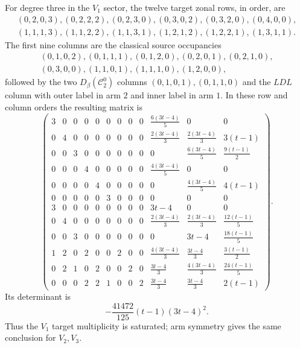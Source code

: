 \documentclass[11pt]{amsart}
\theoremstyle{definition}
\theoremstyle{remark}
\newcommand{\cc}{\mathcal}
\begin{document}
For degree three in the $V_1$ sector, the twelve target zonal rows, in order, are
\[
\begin{gathered}
(0,2,0,3),(0,2,2,2),(0,2,3,0),(0,3,0,2),(0,3,2,0),(0,4,0,0),\\
(1,1,1,3),(1,1,2,2),(1,1,3,1),(1,2,1,2),(1,2,2,1),(1,3,1,1).
\end{gathered}
\]
The first nine columns are the classical source occupancies
\[
\begin{gathered}
(0,1,0,2),(0,1,1,1),(0,1,2,0),(0,2,0,1),(0,2,1,0),\\
(0,3,0,0),(1,1,0,1),(1,1,1,0),(1,2,0,0),
\end{gathered}
\]
followed by the two $D_\beta(\cc C_2^0)$ columns $(0,1,0,1),(0,1,1,0)$ and the $L D L$ column with outer label in arm $2$ and inner label in arm $1$.  In these row and column orders the resulting matrix is
{\scriptsize
\[
\begin{pmatrix}
3&0&0&0&0&0&0&0&0&\frac{6(3t-4)}5&0&0\\
0&4&0&0&0&0&0&0&0&\frac{2(3t-4)}3&\frac{2(3t-4)}3&3(t-1)\\
0&0&3&0&0&0&0&0&0&0&\frac{6(3t-4)}5&\frac{9(t-1)}2\\
0&0&0&4&0&0&0&0&0&\frac{4(3t-4)}5&0&0\\
0&0&0&0&4&0&0&0&0&0&\frac{4(3t-4)}5&4(t-1)\\
0&0&0&0&0&3&0&0&0&0&0&0\\
3&0&0&0&0&0&0&0&0&3t-4&0&0\\
0&4&0&0&0&0&0&0&0&\frac{2(3t-4)}3&\frac{2(3t-4)}3&\frac{12(t-1)}5\\
0&0&3&0&0&0&0&0&0&0&3t-4&\frac{18(t-1)}5\\
1&2&0&2&0&0&2&0&0&\frac{4(3t-4)}3&\frac{3t-4}3&\frac{3(t-1)}2\\
0&2&1&0&2&0&0&2&0&\frac{3t-4}3&\frac{4(3t-4)}3&\frac{24(t-1)}5\\
0&0&0&2&2&1&0&0&2&\frac{3t-4}3&\frac{3t-4}3&2(t-1)
\end{pmatrix}.
\]
}
Its determinant is
\[
-\frac{41472}{125}(t-1)(3t-4)^2.
\]
Thus the $V_1$ target multiplicity is saturated; arm symmetry gives the same conclusion for $V_2,V_3$.
\end{document}
